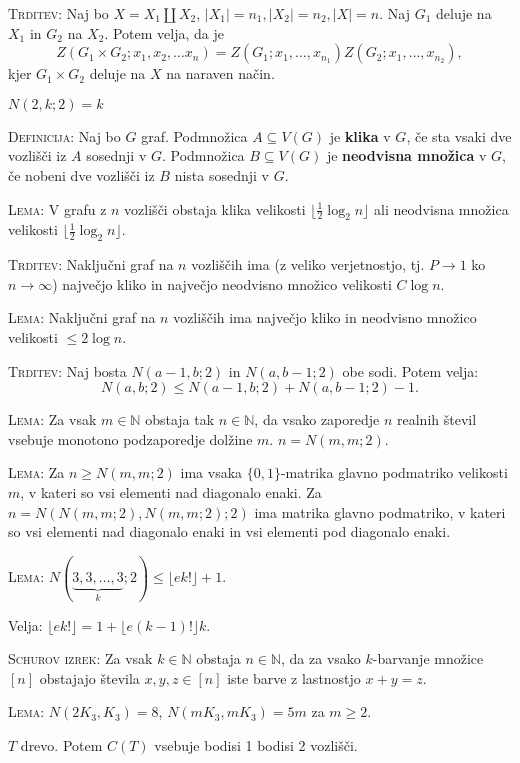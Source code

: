 \documentclass[8pt,a4paper]{amsart}
\theoremstyle{definition} %
\theoremstyle{plain} %
\newcommand{\N}{\mathbb N}
\begin{document}
\textsc{Trditev:} Naj bo $X = X_1  \amalg X_2 $, $|X_1|=n_1, |X_2|=n_2,|X|=n$.
Naj $G_1$ deluje na $X_1$ in $G_2$ na $X_2$. Potem velja, da je
$$ Z(G_1 \times G_2 ;x_1,x_2,\ldots x_n) = Z(G_1;x_1,\ldots ,x_{n_1}) Z(G_2 ;x_1,\ldots , x_{n_2}),$$
kjer $G_1 \times G_2$ deluje na $X$ na naraven način.

$N(2,k;2)=k$

\textsc{Definicija:} Naj bo $G$ graf. Podmnožica $A \subseteq V(G)$ je
\textbf{klika} v $G$, če sta vsaki dve vozlišči iz $A$ sosednji v $G$.
Podmnožica $B \subseteq V(G)$ je \textbf{neodvisna množica} v $G$, če nobeni dve
vozlišči iz $B$ nista sosednji v $G$.

\textsc{Lema:} V grafu z $n$ vozlišči obstaja klika velikosti $\lfloor
\frac{1}{2}\log_2{n}\rfloor$ ali neodvisna množica velikosti $\lfloor
\frac{1}{2}\log_2{n}\rfloor$.

\textsc{Trditev:} Naključni graf na $n$ vozliščih ima (z veliko verjetnostjo,
tj. $P\to1$ ko $n\to\infty$) največjo kliko in največjo
neodvisno množico velikosti $C\log{n}$.

\textsc{Lema:} Naključni graf na $n$ vozliščih ima največjo kliko in neodvisno
množico velikosti $\leq 2\log{n}$.

\textsc{Trditev:} Naj bosta $N(a-1,b;2)$ in $N(a,b-1;2)$ obe sodi. Potem velja:
$$ N(a,b;2) \leq N(a-1,b;2) + N(a,b-1;2) - 1.$$

\textsc{Lema:} Za vsak $m \in \N$ obstaja tak $n \in \N$, da vsako zaporedje
 $n$ realnih števil vsebuje monotono podzaporedje dolžine $m$. $n = N(m,m;2)$.

\textsc{Lema:} Za $n \geq N(m,m;2)$ ima vsaka $\{ 0,1 \}$-matrika glavno
podmatriko velikosti $m$, v kateri so vsi elementi nad diagonalo enaki. Za $n =
N(N(m,m;2),N(m,m;2);2)$ ima matrika glavno podmatriko, v kateri so vsi elementi
nad diagonalo enaki in vsi elementi pod diagonalo enaki.

\textsc{Lema:} $N(\underbrace{3,3,\ldots ,3}_k;2) \leq \lfloor e k! \rfloor + 1$.

Velja: $\lfloor ek! \rfloor = 1 + \lfloor e(k-1)! \rfloor k$.

\textsc{Schurov izrek:} Za vsak $k \in \N$ obstaja $n \in \N$, da za vsako
$k$-barvanje množice $[n]$ obstajajo števila $x,y,z \in [n]$ iste barve z
lastnostjo $x+y=z$.

\textsc{Lema:} $N(2K_3,K_3)=8$, $N(mK_3,mK_3)=5m$ za $m\geq 2$.

$T$ drevo. Potem $C(T)$ vsebuje bodisi 1 bodisi 2 vozlišči.
\end{document}
